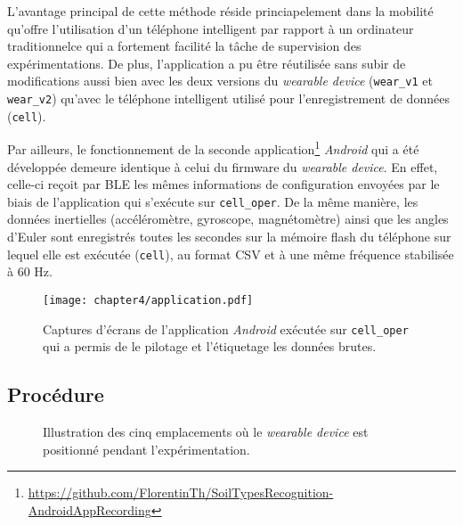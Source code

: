 L'avantage principal de cette méthode réside princiapelement dans la mobilité qu'offre l'utilisation d'un téléphone intelligent par rapport à un ordinateur traditionnel\textemdash ce qui a fortement facilité la tâche de supervision des expérimentations. De plus, l'application a pu être réutilisée sans subir de modifications aussi bien avec les deux versions du \textit{wearable device} (\texttt{wear\_v1} et \texttt{wear\_v2}) qu'avec le téléphone intelligent utilisé pour l'enregistrement de données (\texttt{cell}).

Par ailleurs, le fonctionnement de la seconde application\footnote{\url{https://github.com/FlorentinTh/SoilTypesRecognition-AndroidAppRecording}} \textit{Android} qui a été développée demeure identique à celui du firmware du \textit{wearable device}. En effet, celle-ci reçoit par \acs{BLE} les mêmes informations de configuration envoyées par le biais de l'application qui s'exécute sur \texttt{cell\_oper}. De la même manière, les données inertielles (accéléromètre, gyroscope, magnétomètre) ainsi que les angles d'Euler sont enregistrés toutes les secondes sur la mémoire flash du téléphone sur lequel elle est exécutée (\texttt{cell}), au format \acs{CSV} et à une même fréquence stabilisée à 60 Hz.

\begin{figure}[H]
	\centering
	\texttt{[image: chapter4/application.pdf]}
        \caption{Captures d'écrans de l'application \textit{Android} exécutée sur \texttt{cell\_oper} qui a permis de le pilotage et l'étiquetage les données brutes.}
	\label{fig:application}
\end{figure}

\subsection{Procédure}

\begin{figure}[b!]
	\centering
	\hspace*{\fill}
    \caption{Illustration des cinq emplacements où le \textit{wearable device} est positionné pendant l'expérimentation.}
    \label{fig:positions}
\end{figure}

